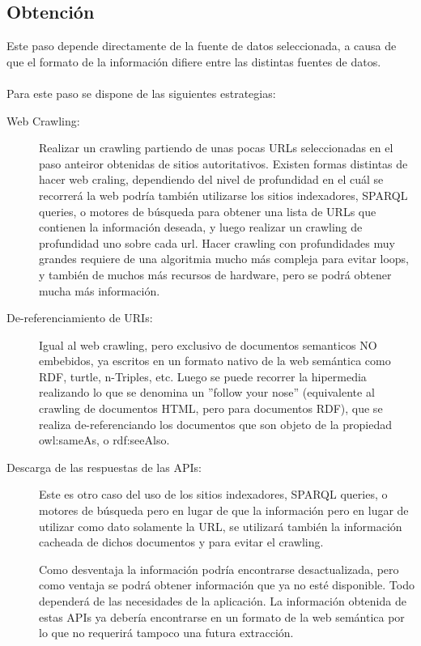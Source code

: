 \subsection{Obtención}

Este paso depende directamente de la fuente de datos seleccionada, a causa de que el formato de la información difiere entre las distintas fuentes de datos.
\\\\
Para este paso se dispone de las siguientes estrategias:
\begin{description}
\item[Web Crawling:] Realizar un crawling partiendo de unas pocas URLs seleccionadas en el paso anteiror obtenidas de sitios autoritativos.
Existen formas distintas de hacer web craling, dependiendo del nivel de profundidad en el cuál se recorrerá la web podría también utilizarse los 
sitios indexadores, SPARQL queries, o motores de búsqueda para obtener una lista de URLs que contienen la información deseada, y luego realizar un crawling de profundidad uno sobre cada url.
Hacer crawling con profundidades muy grandes requiere de una algoritmia mucho más compleja para evitar loops, y también de muchos más recursos de hardware, pero se podrá obtener mucha más información.

\item[De-referenciamiento de URIs:] Igual al web crawling, pero exclusivo de documentos semanticos NO embebidos, ya escritos en un formato nativo de la web semántica como RDF, turtle, n-Triples, etc.
Luego se puede recorrer la hipermedia realizando lo que se denomina un ''follow your nose'' (equivalente al crawling de documentos HTML, pero para documentos RDF), que se realiza de-referenciando los documentos que son objeto de la propiedad owl:sameAs, o rdf:seeAlso.

\item[Descarga de las respuestas de las APIs:] Este es otro caso del uso de los sitios indexadores, SPARQL queries, o motores de búsqueda pero en lugar de 
que la información pero en lugar de utilizar como dato solamente la URL, se utilizará también la información cacheada de dichos documentos y para evitar el crawling.

Como desventaja la información podría encontrarse desactualizada, pero como ventaja se podrá obtener información que ya no esté disponible. Todo dependerá de las necesidades de la aplicación.
La información obtenida de estas APIs ya debería encontrarse en un formato de la web semántica por lo que no requerirá tampoco una futura extracción.


\end{description}
